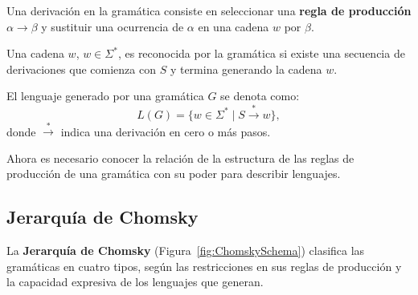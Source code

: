 \documentclass[12pt]{article}
\begin{document}
Una derivación en la gramática consiste en seleccionar una \textbf{regla de producción} $\alpha \to \beta$ y sustituir una ocurrencia de 
$\alpha$ en una cadena $w$ por $\beta$.

Una cadena $w$, $w\in\Sigma^*$,  es reconocida por la gramática si existe una secuencia de derivaciones que comienza con $S$ y termina generando la cadena $w$.

El lenguaje generado por una gramática \(G\) se denota como:
\[
      L(G) = \{ w \in \Sigma^* \mid S \overset{*}{\to} w \},
\]
donde \(\overset{*}{\to}\) indica una derivación en cero o más pasos.

Ahora es necesario conocer la relación de la estructura de las reglas de producción de una gramática con su poder 
para describir lenguajes.

\subsection{Jerarquía de Chomsky}

La \textbf{Jerarquía de Chomsky} (Figura~\ref{fig:ChomskySchema}) clasifica las gramáticas en cuatro tipos, según las restricciones en sus reglas de producción y la capacidad expresiva de los lenguajes que generan.
\end{document}
